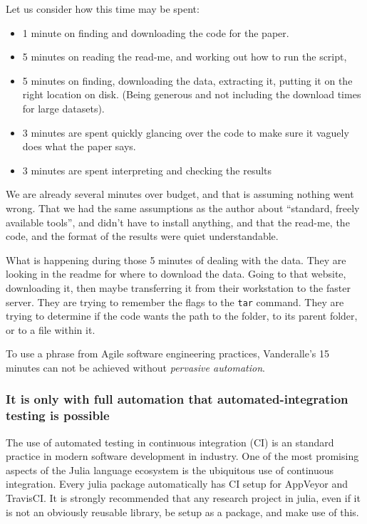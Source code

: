 \documentclass{jors}
\begin{document}
Let us consider how this time may be spent:
\begin{itemize}
	\item 1 minute on finding and downloading the code for the paper.
	\item 5 minutes on reading the read-me, and working out how to run the script,
	\item 5 minutes on finding, downloading the data, extracting it, putting it on the right location on disk. (Being generous and not including the download times for large datasets).
	\item 3 minutes are spent quickly glancing over the code to make sure it vaguely does what the paper says.
	\item 3 minutes are spent interpreting and checking the results
\end{itemize}
We are already several minutes over budget, and that is assuming nothing went wrong.
That we had the same assumptions as the author about ``standard, freely available tools'', and didn't have to install anything,
and that the read-me, the code, and the format of the results were quiet understandable.

What is happening during those 5 minutes of dealing with the data.
They are looking in the readme for where to download the data.
Going to that website, downloading it, then maybe transferring it from their workstation to the faster server.
They are trying to remember the flags to the \texttt{tar} command.
They are trying to determine if the code wants the path to the folder, to its parent folder, or to a file within it.


To use a phrase from Agile software engineering practices, Vanderalle's 15 minutes can not be achieved without \emph{pervasive automation}.

\subsubsection{It is only with full automation that automated-integration testing is possible}
The use of automated testing in continuous integration (CI) is an standard practice in modern software development in industry.
One of the most promising aspects of the Julia language ecosystem is the ubiquitous use of continuous integration.
Every julia package automatically has CI setup for AppVeyor and TravisCI.
It is strongly recommended that any research project in julia, even if it is not an obviously reusable library, be setup as a package, and make use of this.
\end{document}
